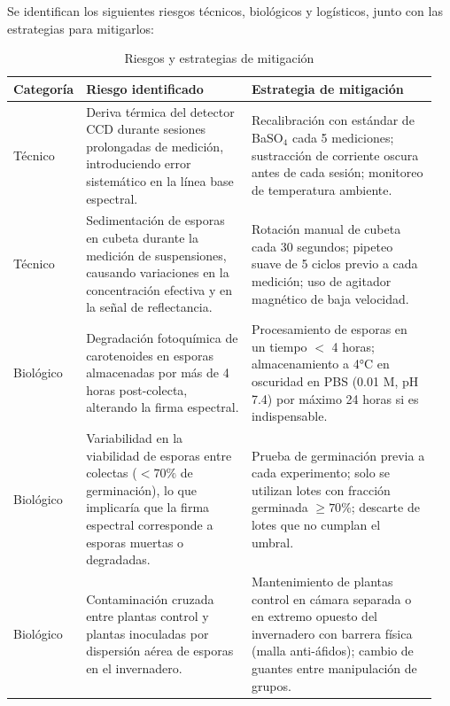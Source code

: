 \documentclass[12pt, a4paper]{article}
\begin{document}
	Se identifican los siguientes riesgos técnicos, biológicos y logísticos, junto con las estrategias para mitigarlos:
	
	\begin{table}
		\caption{Riesgos y estrategias de mitigación}
		\label{tab:riesgos}
		\begin{tabular}{p{0.1\linewidth}p{0.4\linewidth}p{0.45\linewidth}}
			\toprule
			\textbf{Categoría} & \textbf{Riesgo identificado} & \textbf{Estrategia de mitigación} \\
			\midrule
			Técnico & Deriva térmica del detector CCD durante sesiones prolongadas de medición, introduciendo error sistemático en la línea base espectral. & Recalibración con estándar de BaSO$_4$ cada 5 mediciones; sustracción de corriente oscura antes de cada sesión; monitoreo de temperatura ambiente. \\
			\midrule
			Técnico & Sedimentación de esporas en cubeta durante la medición de suspensiones, causando variaciones en la concentración efectiva y en la señal de reflectancia. & Rotación manual de cubeta cada 30 segundos; pipeteo suave de 5 ciclos previo a cada medición; uso de agitador magnético de baja velocidad. \\
			\midrule
			Biológico & Degradación fotoquímica de carotenoides en esporas almacenadas por más de 4 horas post-colecta, alterando la firma espectral. & Procesamiento de esporas en un tiempo $<$ 4 horas; almacenamiento a 4°C en oscuridad en PBS (0.01 M, pH 7.4) por máximo 24 horas si es indispensable. \\
			\midrule
			Biológico & Variabilidad en la viabilidad de esporas entre colectas ($<70\%$ de germinación), lo que implicaría que la firma espectral corresponde a esporas muertas o degradadas. & Prueba de germinación previa a cada experimento; solo se utilizan lotes con fracción germinada $\geq 70\%$; descarte de lotes que no cumplan el umbral. \\
			\midrule
			\newpage
			Biológico & Contaminación cruzada entre plantas control y plantas inoculadas por dispersión aérea de esporas en el invernadero. & Mantenimiento de plantas control en cámara separada o en extremo opuesto del invernadero con barrera física (malla anti-áfidos); cambio de guantes entre manipulación de grupos. \\


\end{tabular}
\end{table}
\end{document}
